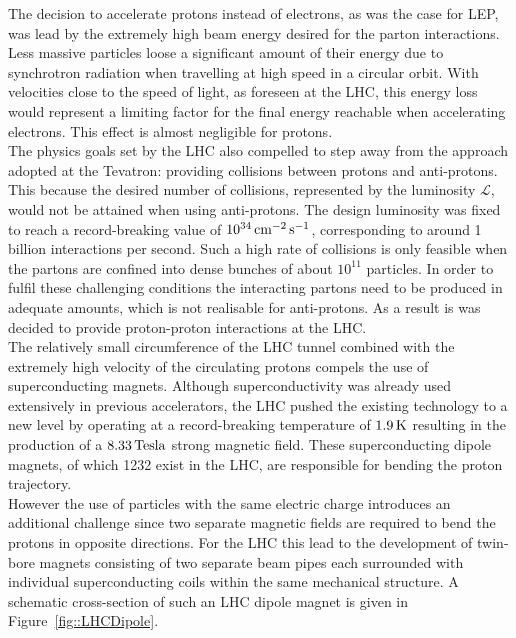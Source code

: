 The decision to accelerate protons instead of electrons, as was the case for LEP, was lead by the extremely high beam energy desired for the parton interactions. Less massive particles loose a significant amount of their energy due to synchrotron radiation when travelling at high speed in a circular orbit. With velocities close to the speed of light, as foreseen at the LHC, this energy loss would represent a limiting factor for the final energy reachable when accelerating electrons. This effect is almost negligible for protons.
\\
The physics goals set by the LHC also compelled to step away from the approach adopted at the Tevatron: providing collisions between protons and anti-protons. This because the desired number of collisions, represented by the luminosity $\mathcal{L}$, would not be attained when using anti-protons. The design luminosity was fixed to reach a record-breaking value of $10^{34} \, \mathrm{cm}^{-2} \, \mathrm{s}^{-1}$, corresponding to around 1 billion interactions per second. Such a high rate of collisions is only feasible when the partons are confined into dense bunches of about $10^{11}$ particles.
In order to fulfil these challenging conditions the interacting partons need to be produced in adequate amounts, which is not realisable for anti-protons.
As a result is was decided to provide proton-proton interactions at the LHC.
\\
The relatively small circumference of the LHC tunnel combined with the extremely high velocity of the circulating protons compels the use of superconducting magnets. Although superconductivity was already used extensively in previous accelerators, the LHC pushed the existing technology to a new level by operating at a record-breaking temperature of $1.9 \, \mathrm{K}$ resulting in the production of a $8.33 \, \mathrm{Tesla}$ strong magnetic field. 
These superconducting dipole magnets, of which 1232 exist in the LHC, are responsible for bending the proton trajectory.
\\
However the use of particles with the same electric charge introduces an additional challenge since two separate magnetic fields are required to bend the protons in opposite directions. For the LHC this lead to the development of twin-bore magnets consisting of two separate beam pipes each surrounded with individual superconducting coils within the same mechanical structure.
A schematic cross-section of such an LHC dipole magnet is given in Figure~\ref{fig::LHCDipole}.
